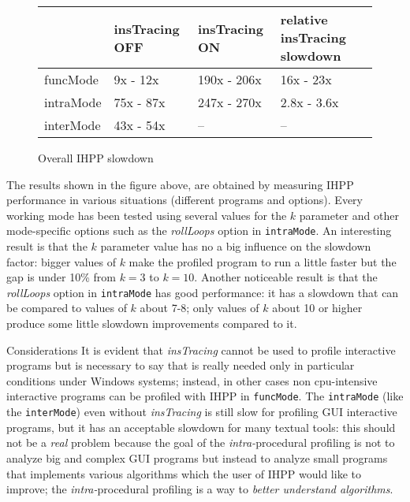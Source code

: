 \documentclass[a4paper,10pt]{report}
\begin{document}
\begin{figure}[H]

\centering

{\renewcommand{\arraystretch}{1.2}
\renewcommand{\tabcolsep}{0.2cm}
\begin{tabular}{l|l|l|l}
& insTracing OFF & insTracing ON & relative insTracing slowdown\\
\hline
funcMode & 9x - 12x & 190x - 206x & 16x - 23x\\
intraMode & 75x - 87x & 247x - 270x & 2.8x - 3.6x\\
interMode & 43x - 54x & -- & --\\
\end{tabular}}

\caption{Overall IHPP slowdown}
\label{totalslowdown}
\end{figure}

\noindent
The results shown in the figure above, are obtained by measuring
IHPP performance in various situations (different programs and options).
Every working mode has been tested using
several values for the $k$ parameter and other mode-specific options
such as the \emph{rollLoops} option in \verb|intraMode|.
An interesting result is that the $k$ parameter value has no a
big influence on the slowdown factor: bigger values of $k$ make
the profiled program to run a little faster but the gap is under 10\%
from $k=3$ to $k=10$. Another noticeable result is that
the \emph{rollLoops} option in \verb|intraMode| has good performance:
it has a slowdown that can be compared to values of $k$ about 7-8;
only values of $k$ about 10 or higher produce
some little slowdown improvements compared to it.

\begin{paragraph}{Considerations}
It is evident that \emph{insTracing} cannot be used to profile
interactive programs but is necessary to say that is really needed
only in particular conditions under Windows systems; instead,
in other cases non cpu-intensive interactive programs can be profiled with IHPP
in \verb|funcMode|. The \verb|intraMode| (like the \verb|interMode|) even without \emph{insTracing} is still slow for profiling GUI interactive programs,
but it has an acceptable slowdown for
many textual tools: this should not be a \emph{real} problem because
the goal of the \emph{intra-}procedural profiling is not to analyze big and complex
GUI programs but instead to analyze small programs that
implements various algorithms which the user of IHPP would like to improve;
the \emph{intra-}procedural profiling is a way to \emph{better understand algorithms}.
\end{paragraph}
\end{document}
